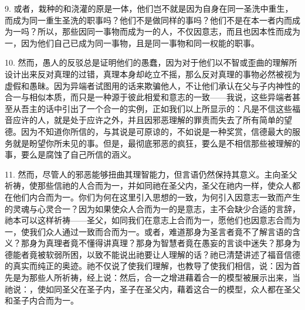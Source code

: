 9. 或者，栽种的和浇灌的原是一体，他们岂不就是因为自身在同一圣洗中重生，而成为同一重生圣洗的职事吗？他们不是做同样的事吗？他们不是在本一者内而成为一吗？所以，那些因同一事物而成为一的人，不仅因意志，而且也因本性而成为一，因为他们自己已成为同一事物，且是同一事物和同一权能的职事。\newline{}\par

10. 然而，愚人的反驳总是证明他们的愚蠢，因为对于他们以不智或歪曲的理解所设计出来反对真理的过错，真理本身却屹立不摇，那么反对真理的事物必然被视为虚假和愚昧。因为异端者试图用的话来欺骗他人，不让他们承认在父与子内神性的合一与相似本质，而只是一种源于彼此相爱和意志的一致——我说，这些异端者甚至从吾主的话中引出了一个合一的实例，正如我们以上所显示的：凡是不信这些福音应许的人，就是处于应许之外，并且因邪恶理解的罪责而失去了所有简单的望德。因为不知道你所信的，与其说是可原谅的，不如说是一种奖赏，信德最大的服务就是盼望你所未见的事。但是，最彻底邪恶的疯狂，要么是不相信那些被理解的事，要么是腐蚀了自己所信的涵义。\newline{}\par

11. 然而，尽管人的邪恶能够扭曲其理智能力，但言语仍然保持其意义。主向圣父祈祷，使那些信祂的人合而为一，并如同祂在圣父内，圣父在祂内一样，使众人都在他们内合而为一。你们为何在这里引入思想的一致，为何引入因意志一致而产生的灵魂与心灵合一？因为如果使众人合而为一的是意志，主不会缺少合适的言辞，祂本可以这样祈祷——圣父，如同我们在意志上合而为一，愿他们也因意志合而为一，使我们众人通过一致而合而为一。或者，难道那身为圣言者竟不了解言语的含义？那身为真理者竟不懂得讲真理？那身为智慧者竟在愚妄的言谈中迷失？那身为德能者竟被软弱所困，以致不能说出祂要让人理解的话？祂已清楚讲述了福音信德的真实而纯正的奥迹。祂不仅说了使我们理解，也教导了使我们相信，说：因为首先是为那些人所祈祷，经上说：然后，合一之增进藉着合一的模型被展示出来，当祂说：，使如同圣父在圣子内，圣子在圣父内，藉着这合一的模型，众人都在圣父和圣子内合而为一。\par

